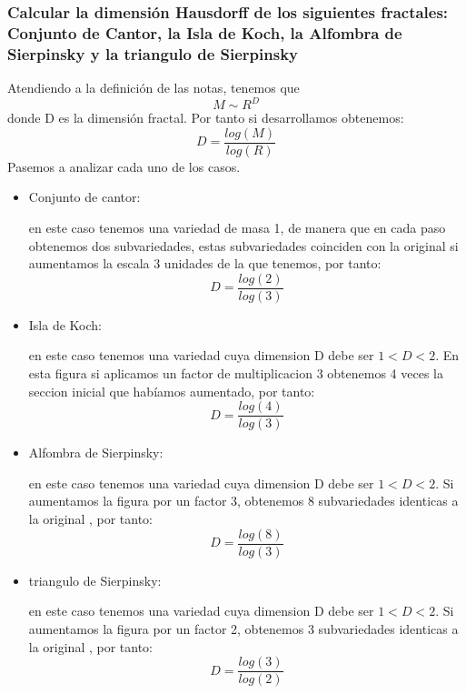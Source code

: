 \subsubsection{\large Calcular la dimensión Hausdorff de los siguientes fractales: Conjunto de Cantor, la Isla de Koch, la Alfombra de Sierpinsky y la triangulo de Sierpinsky} 
 Atendiendo a la definición de las notas, tenemos que $$M\sim R^D$$
 donde D es la dimensión fractal. 
 Por tanto si desarrollamos obtenemos: 
$$D=\frac{log(M)}{log(R)}$$
Pasemos a analizar cada uno de los casos. 
\begin{itemize}
	\item Conjunto de cantor:
	
	en este caso tenemos una variedad de masa 1, de manera que en cada paso obtenemos dos subvariedades, estas subvariedades coinciden con la original si aumentamos la escala 3 unidades de la que tenemos, por tanto:  $$D=\frac{log(2)}{log(3)}$$
	
	\item Isla de Koch:
	
	en este caso tenemos una variedad cuya dimension D debe ser $1<D<2$. En esta figura si aplicamos un factor de multiplicacion 3 obtenemos 4 veces la seccion inicial que habíamos aumentado, por tanto:  $$D=\frac{log(4)}{log(3)}$$

	\item Alfombra de Sierpinsky:
	
	en este caso tenemos una variedad cuya dimension D debe ser $1<D<2$. Si aumentamos la figura por un factor 3, obtenemos 8 subvariedades identicas a la original , por tanto:  $$D=\frac{log(8)}{log(3)}$$
	
	\item triangulo de Sierpinsky:
	
	en este caso tenemos una variedad cuya dimension D debe ser $1<D<2$. Si aumentamos la figura por un factor 2, obtenemos 3 subvariedades identicas a la original , por tanto:  $$D=\frac{log(3)}{log(2)}$$
\end{itemize}





